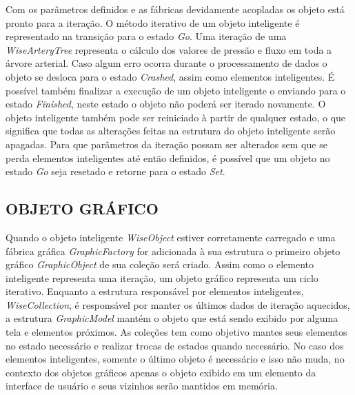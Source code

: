 \documentclass[a4paper,12pt]{monografia}
\theoremstyle{plain}
\theoremstyle{definition}
\theoremstyle{remark}
\begin{document}
Com os parâmetros definidos e as fábricas devidamente acopladas os objeto está pronto para a iteração. O método iterativo de um objeto inteligente é representado na transição para o estado \textit{Go}. Uma iteração de uma \textit{WiseArteryTree} representa o cálculo dos valores de pressão e fluxo em toda a árvore arterial. Caso algum erro ocorra durante o processamento de dados o objeto se desloca para o estado \textit{Crashed}, assim como elementos inteligentes. É possível também finalizar a execução de um objeto inteligente o enviando para o estado \textit{Finished}, neste estado o objeto não poderá ser iterado novamente. O objeto inteligente também pode ser reiniciado à partir de qualquer estado, o que significa que todas as alterações feitas na estrutura do objeto inteligente serão apagadas. Para que parâmetros da iteração possam ser alterados sem que se perda elementos inteligentes até então definidos, é possível que um objeto no estado \textit{Go} seja resetado e retorne para o estado \textit{Set}.

\subsection{OBJETO GRÁFICO}\label{sec:objeto_grafico}


Quando o objeto inteligente \textit{WiseObject} estiver corretamente carregado e uma fábrica gráfica \textit{GraphicFactory} for adicionada à sua estrutura o primeiro objeto gráfico \textit{GraphicObject} de sua coleção será criado. Assim como o elemento inteligente representa uma iteração, um objeto gráfico representa um ciclo iterativo. Enquanto a estrutura responsável por elementos inteligentes, \textit{WiseCollection}, é responsável por manter os últimos dados de iteração aquecidos, a estrutura \textit{GraphicModel} mantém o objeto que está sendo exibido por alguma tela e elementos próximos. As coleções tem como objetivo mantes seus elementos no estado necessário e realizar trocas de estados quando necessário. No caso dos elementos inteligentes, somente o último objeto é necessário e isso não muda, no contexto dos objetos gráficos apenas o objeto exibido em um elemento da interface de usuário e seus vizinhos serão mantidos em memória.
\end{document}
